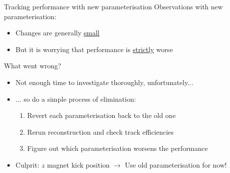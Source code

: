 \documentclass[xcolor={dvipsnames}]{beamer}
\begin{document}
\begin{frame}{Tracking performance with new parameterisation}
  \vspace{0.0cm}
  {\Large Observations with new parameterisation:}
  \vspace{0.3cm}
  \begin{itemize}
    \setlength\itemsep{1.0em}
    \item{Changes are generally \underline{small}}
    \item{But it is worrying that performance is \underline{strictly} worse}
  \end{itemize}
  \vspace{0.6cm}
  {\Large What went wrong?}
  \vspace{0.3cm}
  \begin{itemize}
    \setlength\itemsep{1.0em}
    \item{Not enough time to investigate thoroughly, unfortunately...}
    \item{... so do a simple process of elimination:}
    \begin{enumerate}
      \item{Revert each parameterisation back to the old one}
      \item{Rerun reconstruction and check track efficiencies}
      \item{Figure out which parameterisation worsens the performance}
    \end{enumerate}
    \item{Culprit: $z$ magnet kick position $\to$ Use old parameterisation for now!}
  \end{itemize}
\end{frame}
\end{document}
